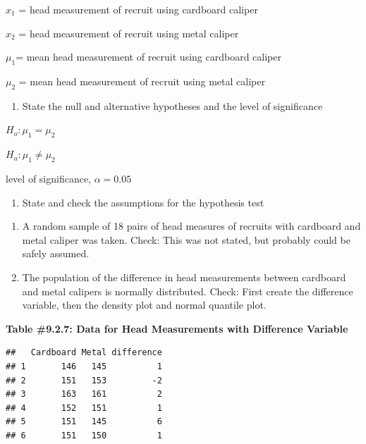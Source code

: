 \documentclass[]{book}
\newenvironment{Shaded}{\begin{snugshade}}{\end{snugshade}}
\newcommand{\DataTypeTok}[1]{\textcolor[rgb]{0.13,0.29,0.53}{#1}}
\newcommand{\KeywordTok}[1]{\textcolor[rgb]{0.13,0.29,0.53}{\textbf{#1}}}
\newcommand{\NormalTok}[1]{#1}
\newcommand{\OperatorTok}[1]{\textcolor[rgb]{0.81,0.36,0.00}{\textbf{#1}}}
\newcommand{\StringTok}[1]{\textcolor[rgb]{0.31,0.60,0.02}{#1}}
\providecommand{\tightlist}{%
  \setlength{\itemsep}{0pt}\setlength{\parskip}{0pt}}
\begin{document}
\(x_1\) = head measurement of recruit using cardboard caliper

\(x_2\) = head measurement of recruit using metal caliper

\(\mu_1\)= mean head measurement of recruit using cardboard caliper

\(\mu_2\) = mean head measurement of recruit using metal caliper

\begin{enumerate}
\def\labelenumi{\arabic{enumi}.}
\setcounter{enumi}{1}
\tightlist
\item
  State the null and alternative hypotheses and the level of significance
\end{enumerate}

\(H_o:\mu_1=\mu_2\)

\(H_a:\mu_1\ne \mu_2\)

level of significance, \(\alpha=0.05\)

\begin{enumerate}
\def\labelenumi{\arabic{enumi}.}
\setcounter{enumi}{2}
\tightlist
\item
  State and check the assumptions for the hypothesis test
\end{enumerate}

\begin{enumerate}
\def\labelenumi{\alph{enumi}.}
\item
  A random sample of 18 pairs of head measures of recruits with cardboard and metal caliper was taken. Check: This was not stated, but probably could be safely assumed.
\item
  The population of the difference in head measurements between cardboard and metal calipers is normally distributed. Check: First create the difference variable, then the density plot and normal quantile plot.
\end{enumerate}

\textbf{Table \#9.2.7: Data for Head Measurements with Difference Variable}

\begin{Shaded}
\end{Shaded}

\begin{verbatim}
##   Cardboard Metal difference
## 1       146   145          1
## 2       151   153         -2
## 3       163   161          2
## 4       152   151          1
## 5       151   145          6
## 6       151   150          1
\end{verbatim}
\end{document}
